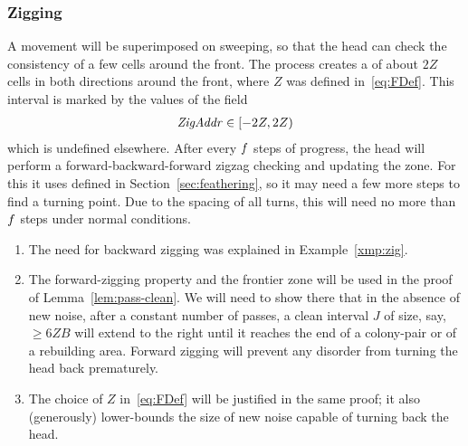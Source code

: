 \documentclass[11pt]{memoir}
\theoremstyle{definition} %
\renewcommand{\le}{\leq}
\renewcommand{\ge}{\geq}
\newcommand{\fld}[1]{\ensuremath{\textit{#1\/}}}
\def\B{B}
\newcommand{\Z}{Z} %
\newcommand{\ZigAddr}{\fld{ZigAddr}}
\begin{document}
\subsubsection{Zigging}\label{sec:zigging}

A  movement will be superimposed on sweeping,
so that the head can check the consistency of a few cells around the front.
The process creates a  of about \( 2\Z \) cells in both directions around the front,
where \( \Z \) was defined in~\eqref{eq:FDef}.
This interval is marked by the values of the field
\begin{align*}
  \ZigAddr\in\lint{-2\Z}{2\Z}
\end{align*}
which is undefined elsewhere.
After every \( f \) steps of progress, the head will perform a forward-backward-forward
zigzag checking and updating the zone.
For this it uses  defined in Section~\ref{sec:feathering},
so it may need a few more steps to find a turning point.
Due to the spacing of all turns, this will need
no more than \( f \) steps under normal conditions. %

\begin{remarks}\label{rem:zigging-choices}
  \begin{enumerate}
  \item The need for backward zigging was explained in Example~\ref{xmp:zig}.
  \item The forward-zigging property and the frontier zone
    will be used in the proof of Lemma~\ref{lem:pass-clean}.
    We will need to show there that
    in the absence of new noise, after a constant number of passes, a clean interval \( J \)
    of size, say, \( \ge 6\Z\B \) will extend to the right until it reaches
    the end of a colony-pair or of a rebuilding area.
    Forward zigging will prevent any disorder from turning the head back prematurely.
  \item The choice of  \( \Z \) in~\eqref{eq:FDef} will be justified in the same proof; 
    it also (generously) lower-bounds the size of new noise capable of turning back the head.
  \end{enumerate}
\end{remarks}
\end{document}
